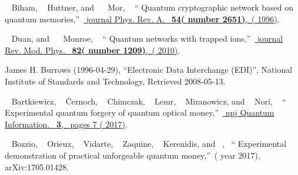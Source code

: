 \documentclass[aps,pra,twocolumn,groupedaddress,showpacs,showkeys]{revtex4-1}
\begin{document}
\begin{thebibliography}{27}
  \BibitemOpen
   { {~\bibnamefont
  {Biham},  {~\bibnamefont
  {Huttner}}, and\  {~\bibnamefont
  {Mor}},} \ }  {\enquote { {Quantum cryptographic network based on quantum memories},}\ }\href {\doibase 10.1103/PhysRevA.54.2651} { {\bibinfo
  {journal} {Phys. Rev. A}.\ }\textbf { {54}(\bibinfo
  {number} {2651})},\ ( {1996})}.%
  
  \BibitemOpen
   { {~\bibnamefont
  {Duan}, and\  {~\bibnamefont
  {Monroe}},} \ }  {\enquote { {Quantum networks with trapped ions},}\ }\href {\doibase 10.1103/RevModPhys.82.1209} { {\bibinfo
  {journal} {Rev. Mod. Phys}.\ }\textbf { {82}(\bibinfo
  {number} {1209})},\ ( {2010})}.%

James H. Burrows (1996-04-29), \enquote{Electronic Data Interchange (EDI)}, National Institute of Standards and Technology, Retrieved 2008-05-13.


  \BibitemOpen
   { {~\bibnamefont
  {Bartkiewicz},  {~\bibnamefont
  {\v{C}ernoch},  {~\bibnamefont
  {Chimczak},  {~\bibnamefont
  {Lemr},  {~\bibnamefont
  {Miranowicz}, and  {~\bibnamefont
  {Nori},}} }}} } \ }  {\enquote { {Experimental quantum forgery of quantum optical money},}\ }\href {\doibase 10.1038/s41534-017-0010-x} { { {npj Quantum Information}.\ } \textbf { {3}},\ \bibinfo
  {pages} {7} ( {2017})}.%

  \BibitemOpen
   { {~\bibnamefont
  {Bozzio}},  {~\bibnamefont
  {Orieux}},  {~\bibnamefont
  {Vidarte}},  {~\bibnamefont
  {Zaquine}},  {~\bibnamefont
  {Kerenidis}}, and\  {},\ }  {\enquote { {Experimental demonstration of practical unforgeable quantum money},}\ }(\bibinfo
  {year} {2017}),\ 
  {	arXiv:1705.01428}.%


\end{thebibliography}
\end{document}

